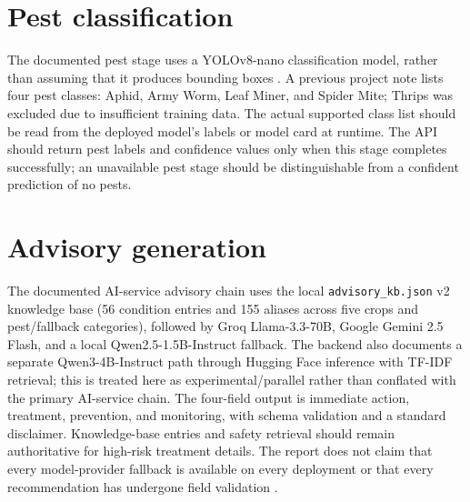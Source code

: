 \documentclass[12pt,a4paper,oneside,openany]{report}
\begin{document}
\section{Pest classification}
The documented pest stage uses a YOLOv8-nano classification model, rather than assuming that it produces bounding boxes \cite{model_cards,ultralytics_docs}. A previous project note lists four pest classes: Aphid, Army Worm, Leaf Miner, and Spider Mite; Thrips was excluded due to insufficient training data. The actual supported class list should be read from the deployed model's labels or model card at runtime. The API should return pest labels and confidence values only when this stage completes successfully; an unavailable pest stage should be distinguishable from a confident prediction of no pests.

\section{Advisory generation}
The documented AI-service advisory chain uses the local \texttt{advisory\_kb.json} v2 knowledge base (56 condition entries and 155 aliases across five crops and pest/fallback categories), followed by Groq Llama-3.3-70B, Google Gemini 2.5 Flash, and a local Qwen2.5-1.5B-Instruct fallback. The backend also documents a separate Qwen3-4B-Instruct path through Hugging Face inference with TF-IDF retrieval; this is treated here as experimental/parallel rather than conflated with the primary AI-service chain. The four-field output is immediate action, treatment, prevention, and monitoring, with schema validation and a standard disclaimer. Knowledge-base entries and safety retrieval should remain authoritative for high-risk treatment details. The report does not claim that every model-provider fallback is available on every deployment or that every recommendation has undergone field validation \cite{model_cards}.
\end{document}
